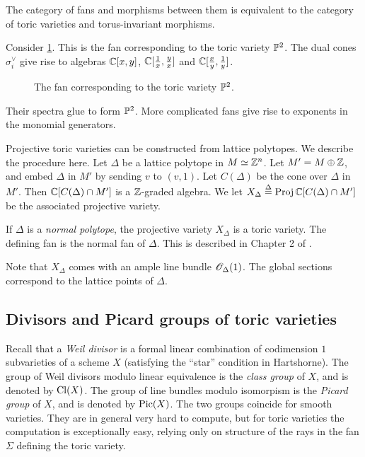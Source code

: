 \begin{remark}
The category of fans and morphisms between them is equivalent to the category of toric varieties and torus-invariant morphisms.
\end{remark}

\begin{example}
Consider \cref{fig:p2fan}. This is the fan corresponding to the toric variety $\P^2$. The dual cones $\sigma_i^\vee$ give rise to algebras $\C[x,y]$, $\C[\frac 1x, \frac yx]$ and $\C[\frac xy, \frac 1y]$.
\begin{figure}
\centering 

\caption{The fan corresponding to the toric variety $\P^2$.}
\label{fig:p2fan}
\end{figure}
Their spectra glue to form $\P^2$. More complicated fans give rise to exponents in the monomial generators.
\end{example}

Projective toric varieties can be constructed from lattice polytopes. We describe the procedure here. Let $\Delta$ be a lattice polytope in $M \simeq \Z^n$. Let $M' = M \oplus \Z$, and embed $\Delta$ in $M'$ by sending $v$ to $(v,1)$. Let $C(\Delta)$ be the cone over $\Delta$ in $M'$. Then $\C[C(\Delta) \cap M']$ is a $\Z$-graded algebra. We let $X_\Delta \stackrel \Delta = \Proj \C[C(\Delta) \cap M']$ be the associated projective variety.

If $\Delta$ is a \emph{normal polytope}, the projective variety $X_\Delta$ is a toric variety. The defining fan is the normal fan of $\Delta$. This is described in Chapter 2 of \cite{cox_toric}.

Note that $X_\Delta$ comes with an ample line bundle $\OO_\Delta(1)$. The global sections correspond to the lattice points of $\Delta$. 

\subsection{Divisors and Picard groups of toric varieties}

Recall that a \emph{Weil divisor} is a formal linear combination of codimension $1$ subvarieties of a scheme $X$ (satisfying the ``star'' condition in Hartshorne). The group of Weil divisors modulo linear equivalence is the \emph{class group} of $X$, and is denoted by $\Cl(X)$. The group of line bundles modulo isomorpism is the \emph{Picard group} of $X$, and is denoted by $\Pic(X)$. The two groups coincide for smooth varieties. They are in general very hard to compute, but for toric varieties the computation is exceptionally easy, relying only on structure of the rays in the fan $\Sigma$ defining the toric variety.

